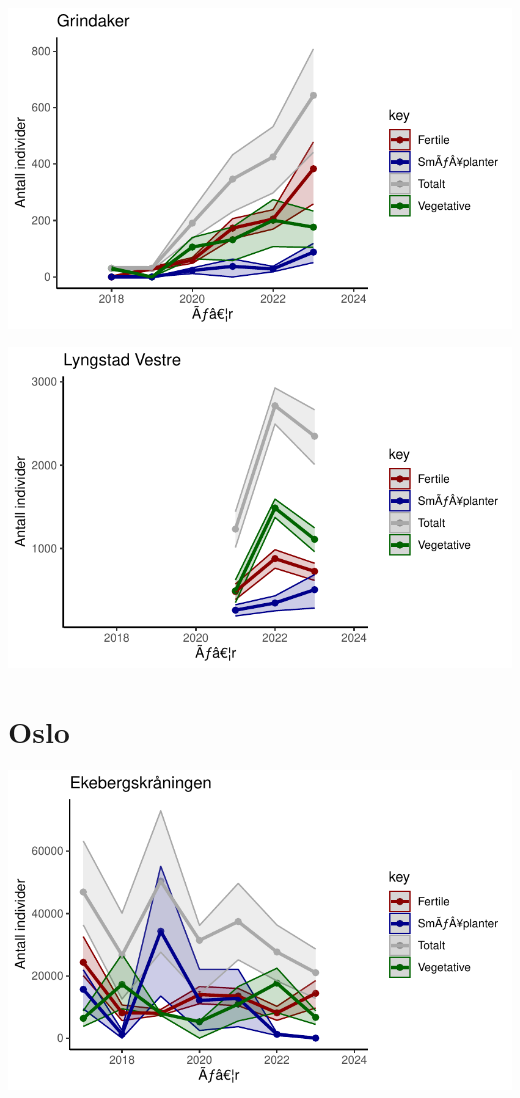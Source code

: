 \documentclass[
  letterpaper,
  DIV=11,
  numbers=noendperiod]{scrreport}
\begin{document}
\includegraphics{localEst_files/figure-pdf/unnamed-chunk-3-5.pdf}

\includegraphics{localEst_files/figure-pdf/unnamed-chunk-3-6.pdf}

\hypertarget{oslo}{%
\section{Oslo}\label{oslo}}

\includegraphics{localEst_files/figure-pdf/unnamed-chunk-4-1.pdf}
\end{document}
